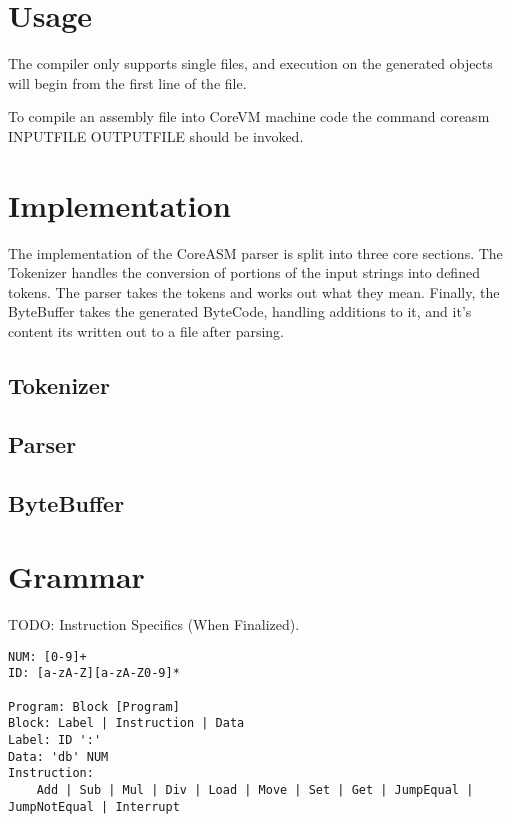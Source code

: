 \documentclass{article}
\begin{document}
\section* {Usage}

The compiler only supports single files, and execution on the generated objects will begin from the first line of the file.

To compile an assembly file into CoreVM machine code the command coreasm INPUTFILE OUTPUTFILE should be invoked.

\section* {Implementation}

The implementation of the CoreASM parser is split into three core sections. The Tokenizer handles the conversion of portions of the input strings into defined tokens.
The parser takes the tokens and works out what they mean. Finally, the ByteBuffer takes the generated ByteCode, handling additions to it, and it's content its written
out to a file after parsing.

\subsection {Tokenizer}
\subsection {Parser}
\subsection {ByteBuffer}

\section* {Grammar}
TODO: Instruction Specifics (When Finalized).
\begin{verbatim}
NUM: [0-9]+
ID: [a-zA-Z][a-zA-Z0-9]*

Program: Block [Program]
Block: Label | Instruction | Data
Label: ID ':'
Data: 'db' NUM
Instruction:
	Add | Sub | Mul | Div | Load | Move | Set | Get | JumpEqual | JumpNotEqual | Interrupt
\end{verbatim}
\end{document}
